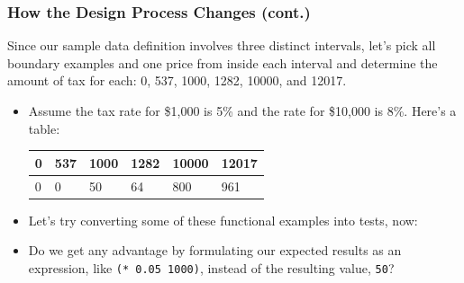 \documentclass{beamer}
\begin{document}



\begin{frame}
  \frametitle{How the Design Process Changes (cont.)}
   Since our sample data definition involves three distinct intervals, let’s pick all boundary examples and one price from inside each interval and determine the amount of tax for each: 0, 537, 1000, 1282, 10000, and 12017.
  \begin{itemize}
 \item<2-> Assume the tax rate for \$1,000 is 5\% and the rate for \$10,000 is 8\%. Here's a table:
   \begin{tabular}{ l | l | l | l | l | l }
     0 & 537 & 1000 & 1282 & 10000 &  12017 \\ \hline
     0 & 0 & 50 & 64 & 800 & 961
   \end{tabular}
 \item<3-> Let's try converting some of these functional examples into tests, now:
   \taxTests
 \item<4-> Do we get any advantage by formulating our expected results as an expression, like \texttt{(* 0.05 1000)}, instead of the resulting value,
   \texttt{50}?
 \end{itemize}
\end{frame}


\end{document}
